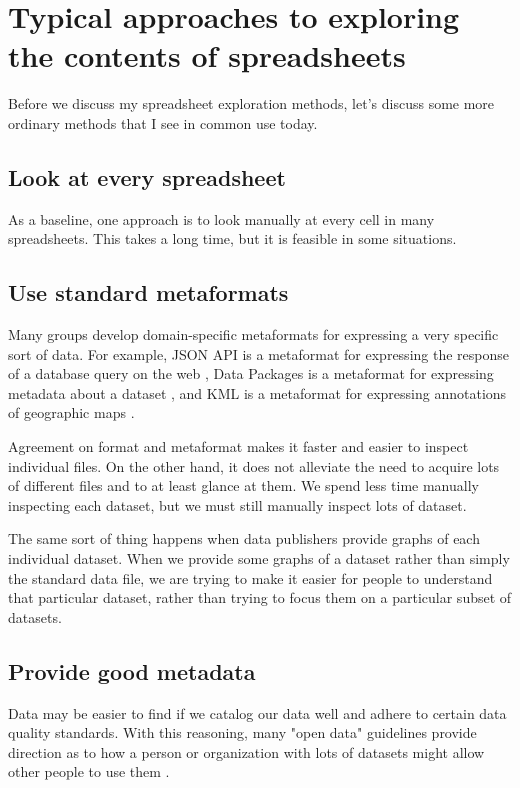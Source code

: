 \documentclass{acm_proc_article-sp}
\begin{document}
\section{Typical approaches to exploring the contents of spreadsheets}
Before we discuss my spreadsheet exploration methods, let's discuss some
more ordinary methods that I see in common use today.

\subsection{Look at every spreadsheet}
As a baseline,
one approach is to look manually at every cell in many spreadsheets.
This takes a long time, but it is feasible in some situations.

\subsection{Use standard metaformats}
Many groups develop domain-specific metaformats for expressing a very specific
sort of data. For example, JSON API is a metaformat for expressing the
response of a database query on the web \cite{jsonapi}, Data Packages is a
metaformat for expressing metadata about a dataset \cite{datapackages},
and KML is a metaformat for expressing annotations of geographic maps \cite{kml}.

Agreement on format and metaformat makes it faster and easier to inspect
individual files. On the other hand, it does not alleviate the
need to acquire lots of different files and to at least glance at them.
We spend less time manually inspecting each dataset, but we must still
manually inspect lots of dataset.

The same sort of thing happens when data publishers provide graphs of
each individual dataset. When we provide some graphs of a dataset
rather than simply the standard data file, we are trying to make it easier for
people to understand that particular dataset, rather than trying to focus
them on a particular subset of datasets.

\subsection{Provide good metadata} \label{guidelines}
Data may be easier to find if we catalog our data well and adhere to
certain data quality standards. With this reasoning,
many "open data" guidelines provide direction as to how a person
or organization with lots of datasets might allow other people
to use them
\cite{open-data-census,fivestars,sunlight,sebastopol,odi}.
\end{document}
